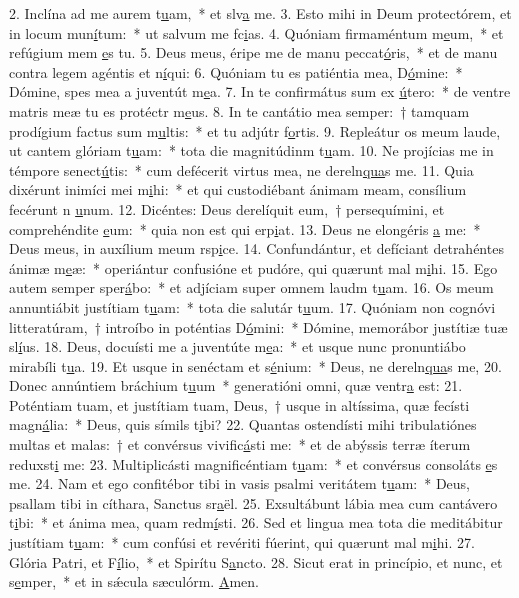 2. Inclína ad me aurem t\uline{u}am,~* et slv\uline{a} me.
3. Esto mihi in Deum protectórem, et in locum mun\uline{í}tum:~* ut salvum me fc\uline{i}as.
4. Quóniam firmaméntum m\uline{e}um,~* et refúgium mem \uline{e}s tu.
5. Deus meus, éripe me de manu peccat\uline{ó}ris,~* et de manu contra legem agéntis et n\uline{í}qui:
6. Quóniam tu es patiéntia mea, D\uline{ó}mine:~* Dómine, spes mea a juventút m\uline{e}a.
7. In te confirmátus sum ex \uline{ú}tero:~* de ventre matris meæ tu es protéctr m\uline{e}us.
8. In te cantátio mea semper:~† tamquam prodígium factus sum m\uline{u}ltis:~* et tu adjútr f\uline{o}rtis.
9. Repleátur os meum laude, ut cantem glóriam t\uline{u}am:~* tota die magnitúdinm t\uline{u}am.
10. Ne projícias me in témpore senect\uline{ú}tis:~* cum defécerit virtus mea, ne dereln\uline{qua}s me.
11. Quia dixérunt inimíci mei m\uline{i}hi:~* et qui custodiébant ánimam meam, consílium fecérunt n \uline{u}num.
12. Dicéntes: Deus derelíquit eum,~† persequímini, et comprehéndite \uline{e}um:~* quia non est qui erp\uline{i}at.
13. Deus ne elongéris \uline{a} me:~* Deus meus, in auxílium meum rsp\uline{i}ce.
14. Confundántur, et defíciant detrahéntes ánimæ m\uline{e}æ:~* operiántur confusióne et pudóre, qui quærunt mal m\uline{i}hi.
15. Ego autem semper sper\uline{á}bo:~* et adjíciam super omnem laudm t\uline{u}am.
16. Os meum annuntiábit justítiam t\uline{u}am:~* tota die salutár t\uline{u}um.
17. Quóniam non cognóvi litteratúram,~† introíbo in poténtias D\uline{ó}mini:~* Dómine, memorábor justítiæ tuæ sl\uline{í}us.
18. Deus, docuísti me a juventúte m\uline{e}a:~* et usque nunc pronuntiábo mirabíli t\uline{u}a.
19. Et usque in senéctam et s\uline{é}nium:~* Deus, ne dereln\uline{qua}s me,
20. Donec annúntiem bráchium t\uline{u}um~* generatióni omni, quæ ventr\uline{a} est:
21. Poténtiam tuam, et justítiam tuam, Deus,~† usque in altíssima, quæ fecísti magn\uline{á}lia:~* Deus, quis símils t\uline{i}bi?
22. Quantas ostendísti mihi tribulatiónes multas et malas:~† et convérsus vivific\uline{á}sti me:~* et de abýssis terræ íterum reduxst\uline{i} me:
23. Multiplicásti magnificéntiam t\uline{u}am:~* et convérsus consoláts \uline{e}s me.
24. Nam et ego confitébor tibi in vasis psalmi veritátem t\uline{u}am:~* Deus, psallam tibi in cíthara, Sanctus sr\uline{a}ël.
25. Exsultábunt lábia mea cum cantávero t\uline{i}bi:~* et ánima mea, quam redm\uline{í}sti.
26. Sed et lingua mea tota die meditábitur justítiam t\uline{u}am:~* cum confúsi et revériti fúerint, qui quærunt mal m\uline{i}hi.
27. Glória Patri, et F\uline{í}lio,~* et Spirítu S\uline{a}ncto.
28. Sicut erat in princípio, et nunc, et s\uline{e}mper,~* et in sǽcula sæculórm. \uline{A}men.
